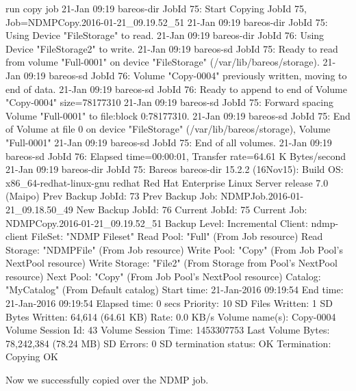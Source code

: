 \begin{bconsole}{run copy job}
21-Jan 09:19 bareos-dir JobId 75: Start Copying JobId 75, Job=NDMPCopy.2016-01-21_09.19.52_51
21-Jan 09:19 bareos-dir JobId 75: Using Device "FileStorage" to read.
21-Jan 09:19 bareos-dir JobId 76: Using Device "FileStorage2" to write.
21-Jan 09:19 bareos-sd JobId 75: Ready to read from volume "Full-0001" on device "FileStorage" (/var/lib/bareos/storage).
21-Jan 09:19 bareos-sd JobId 76: Volume "Copy-0004" previously written, moving to end of data.
21-Jan 09:19 bareos-sd JobId 76: Ready to append to end of Volume "Copy-0004" size=78177310
21-Jan 09:19 bareos-sd JobId 75: Forward spacing Volume "Full-0001" to file:block 0:78177310.
21-Jan 09:19 bareos-sd JobId 75: End of Volume at file 0 on device "FileStorage" (/var/lib/bareos/storage), Volume "Full-0001"
21-Jan 09:19 bareos-sd JobId 75: End of all volumes.
21-Jan 09:19 bareos-sd JobId 76: Elapsed time=00:00:01, Transfer rate=64.61 K Bytes/second
21-Jan 09:19 bareos-dir JobId 75: Bareos bareos-dir 15.2.2 (16Nov15):
  Build OS:               x86_64-redhat-linux-gnu redhat Red Hat Enterprise Linux Server release 7.0 (Maipo)
  Prev Backup JobId:      73
  Prev Backup Job:        NDMPJob.2016-01-21_09.18.50_49
  New Backup JobId:       76
  Current JobId:          75
  Current Job:            NDMPCopy.2016-01-21_09.19.52_51
  Backup Level:           Incremental
  Client:                 ndmp-client
  FileSet:                "NDMP Fileset"
  Read Pool:              "Full" (From Job resource)
  Read Storage:           "NDMPFile" (From Job resource)
  Write Pool:             "Copy" (From Job Pool's NextPool resource)
  Write Storage:          "File2" (From Storage from Pool's NextPool resource)
  Next Pool:              "Copy" (From Job Pool's NextPool resource)
  Catalog:                "MyCatalog" (From Default catalog)
  Start time:             21-Jan-2016 09:19:54
  End time:               21-Jan-2016 09:19:54
  Elapsed time:           0 secs
  Priority:               10
  SD Files Written:       1
  SD Bytes Written:       64,614 (64.61 KB)
  Rate:                   0.0 KB/s
  Volume name(s):         Copy-0004
  Volume Session Id:      43
  Volume Session Time:    1453307753
  Last Volume Bytes:      78,242,384 (78.24 MB)
  SD Errors:              0
  SD termination status:  OK
  Termination:            Copying OK
\end{bconsole}

Now we successfully copied over the NDMP job.


